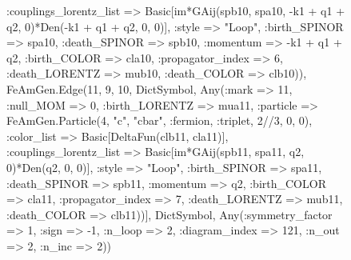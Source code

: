 \documentclass{revtex4}
\begin{document}
\begin{figure}[!htb]
\begin{center}
{:couplings_lorentz_list => Basic[im*GAij(spb10, spa10, -k1 + q1 + q2, 0)*Den(-k1 + q1 + q2, 0, 0)], :style => "Loop", :birth_SPINOR => spa10, :death_SPINOR => spb10, :momentum => -k1 + q1 + q2, :birth_COLOR => cla10, :propagator_index => 6, :death_LORENTZ => mub10, :death_COLOR => clb10)), FeAmGen.Edge(11, 9, 10, Dict{Symbol, Any}(:mark => 11, :null_MOM => 0, :birth_LORENTZ => mua11, :particle => FeAmGen.Particle(4, "c", "cbar", :fermion, :triplet, 2//3, 0, 0), :color_list => Basic[DeltaFun(clb11, cla11)], :couplings_lorentz_list => Basic[im*GAij(spb11, spa11, q2, 0)*Den(q2, 0, 0)], :style => "Loop", :birth_SPINOR => spa11, :death_SPINOR => spb11, :momentum => q2, :birth_COLOR => cla11, :propagator_index => 7, :death_LORENTZ => mub11, :death_COLOR => clb11))], Dict{Symbol, Any}(:symmetry_factor => 1, :sign => -1, :n_loop => 2, :diagram_index => 121, :n_out => 2, :n_inc => 2)) 
}
\end{center}
\end{figure}
\end{document}
